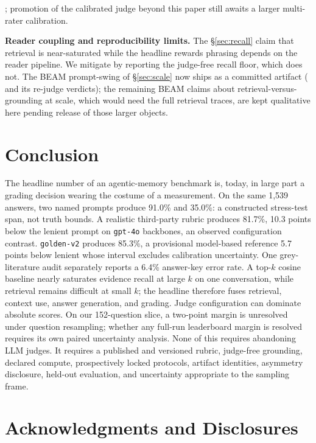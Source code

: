 \documentclass[11pt]{article}
\begin{document}
; promotion of the calibrated judge beyond this paper still awaits a larger multi-rater calibration.

\textbf{Reader coupling and reproducibility limits.} The \S\ref{sec:recall} claim that retrieval is near-saturated while the headline rewards phrasing depends on the reader pipeline. We mitigate by reporting the judge-free recall floor, which does not. The BEAM prompt-swing of \S\ref{sec:scale} now ships as a committed artifact ( and its re-judge verdicts); the remaining BEAM claims about retrieval-versus-grounding at scale, which would need the full retrieval traces, are kept qualitative here pending release of those larger objects.

\section{Conclusion}\label{sec:conclusion}

The headline number of an agentic-memory benchmark is, today, in large part a grading decision wearing the costume of a measurement. On the same 1{,}539 answers, two named prompts produce 91.0\% and 35.0\%: a constructed stress-test span, not truth bounds. A realistic third-party rubric produces 81.7\%, 10.3 points below the lenient prompt on \texttt{gpt-4o} backbones, an observed configuration contrast. \texttt{golden-v2} produces 85.3\%, a provisional model-based reference 5.7 points below lenient whose interval excludes calibration uncertainty. One grey-literature audit separately reports a 6.4\% answer-key error rate. A top-$k$ cosine baseline nearly saturates evidence recall at large $k$ on one conversation, while retrieval remains difficult at small $k$; the headline therefore fuses retrieval, context use, answer generation, and grading. Judge configuration can dominate absolute scores. On our 152-question slice, a two-point margin is unresolved under question resampling; whether any full-run leaderboard margin is resolved requires its own paired uncertainty analysis. None of this requires abandoning LLM judges. It requires a published and versioned rubric, judge-free grounding, declared compute, prospectively locked protocols, artifact identities, asymmetry disclosure, held-out evaluation, and uncertainty appropriate to the sampling frame.

\section*{Acknowledgments and Disclosures}
\end{document}
